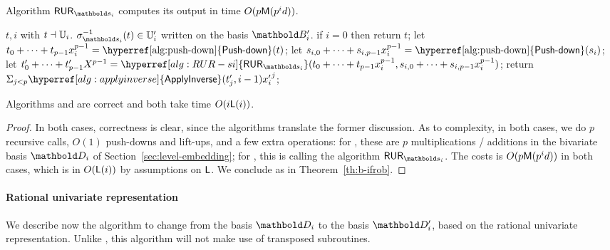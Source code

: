 \begin{lemma}
  \label{th:rur-s}
  Algorithm \hyperref[alg:RUR-si]{$\alg{RUR}_{\lst{s}_i}$} computes
  its output in time $O(p\mathsf{M}(p^id))$.
\end{lemma}

\begin{algorithm}
  \caption{\label{alg:applyinverse}} 
  \begin{algorithmic}[1]
    \REQUIRE $t,i$ with $t \dashv \mathbb{U}_i$.
    \ENSURE $\sigma_{\lst{s}_i}^{-1}(t)\in \U'_i$ written on the basis $\basis{B}'_i$.
    \STATE if $i=0$ then return $t$;
    \STATE let $t_0 + \cdots + t_{p-1}x_i^{p-1} = \text{\hyperref[alg:push-down]{\alg{Push-down}}}(t)$;
    \STATE let $s_{i,0}+\cdots+s_{i,p-1}x_i^{p-1}=\text{\hyperref[alg:push-down]{\alg{Push-down}}}(s_i)$;
    \STATE let $t'_0 + \cdots + t'_{p-1}X^{p-1} = \hyperref[alg:RUR-si]{\alg{RUR}_{\lst{s}_i}}
  (t_0 + \cdots + t_{p-1}x_i^{p-1}, s_{i,0}+\cdots+s_{i,p-1}x_i^{p-1})$;
  \STATE return $\Sigma_{j < p} \hyperref[alg:applyinverse]{\alg{ApplyInverse}}(t'_j, i-1) {x'_i}^j$;
\end{algorithmic}
\end{algorithm}

\begin{proposition}\label{Prop:apply}
  Algorithms \hyperref[alg:applyisomorphism]{} and \hyperref[alg:applyinverse]{} are correct
  and both take time $O(i\mathsf{L}(i))$.
\end{proposition}
\begin{proof}
  In both cases, correctness is clear, since the algorithms translate
  the former discussion. As to complexity, in both cases, we do $p$
  recursive calls, $O(1)$ push-downs and lift-ups, and a few extra
  operations: for \hyperref[alg:applyisomorphism]{}, these are $p$
  multiplications / additions in the bivariate basis $\basis{D}_i$ of
  Section~\ref{sec:level-embedding}; for \hyperref[alg:applyinverse]{}, this is
  calling the algorithm
  \hyperref[alg:RUR-si]{$\alg{RUR}_{\lst{s}_i}$}.  The costs is
  $O(p\mathsf{M}(p^id))$ in both cases, which is in $O(\mathsf{L}(i))$ by
  assumptions on $\mathsf{L}$. We conclude as in Theorem~\ref{th:b-ifrob}.
\end{proof}


\paragraph{Rational univariate representation}
We describe now the algorithm to change from the basis $\basis{D}_i$
to the basis $\basis{D}_i'$, based on the rational univariate
representation. Unlike \hyperref[alg:liftup]{}, this algorithm will not make use
of transposed subroutines.

